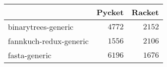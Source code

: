 %
{\footnotesize
\begin{tabular}{l@{}r@{}r}
\toprule
\multicolumn{1}{l}{}&\multicolumn{1}{c}{Pycket}&\multicolumn{1}{c}{Racket}\tabularnewline
\midrule
binarytrees-generic&$4772$&$2152$\tabularnewline
fannkuch-redux-generic&$1556$&$2106$\tabularnewline
fasta-generic&$6196$&$1676$\tabularnewline
\bottomrule
\end{tabular}
}

